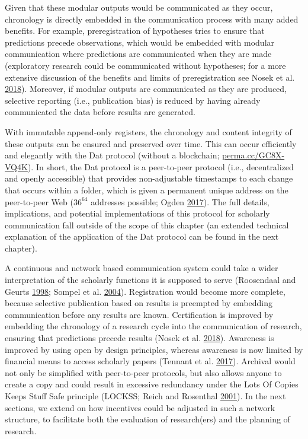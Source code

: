 \documentclass[a5paper]{book}
\begin{document}
Given that these modular outputs would be communicated as they occur,
chronology is directly embedded in the communication process with many
added benefits. For example, preregistration of hypotheses tries to
ensure that predictions precede observations, which would be embedded
with modular communication where predictions are communicated when they
are made (exploratory research could be communicated without hypotheses;
for a more extensive discussion of the benefits and limits of
preregistration see Nosek et al.
\protect\hyperlink{ref-doi:10.1073ux2fpnas.1708274114}{2018}). Moreover,
if modular outputs are communicated as they are produced, selective
reporting (i.e., publication bias) is reduced by having already
communicated the data before results are generated.

With immutable append-only registers, the chronology and content
integrity of these outputs can be ensured and preserved over time. This
can occur efficiently and elegantly with the Dat protocol (without a
blockchain; \href{https://perma.cc/GC8X-VQ4K}{perma.cc/GC8X-VQ4K}). In
short, the Dat protocol is a peer-to-peer protocol (i.e., decentralized
and openly accessible) that provides non-adjustable timestamps to each
change that occurs within a folder, which is given a permanent unique
address on the peer-to-peer Web (\(36^{64}\) addresses possible; Ogden
\protect\hyperlink{ref-doi:10.31219ux2fosf.ioux2fnsv2c}{2017}). The full
details, implications, and potential implementations of this protocol
for scholarly communication fall outside of the scope of this chapter
(an extended technical explanation of the application of the Dat
protocol can be found in the next chapter).

A continuous and network based communication system could take a wider
interpretation of the scholarly functions it is supposed to serve
(Roosendaal and Geurts \protect\hyperlink{ref-roosendaal1998}{1998};
Sompel et al.
\protect\hyperlink{ref-doi:10.1045ux2fseptember2004-vandesompel}{2004}).
Registration would become more complete, because selective publication
based on results is preempted by embedding communication before any
results are known. Certification is improved by embedding the chronology
of a research cycle into the communication of research, ensuring that
predictions precede results (Nosek et al.
\protect\hyperlink{ref-doi:10.1073ux2fpnas.1708274114}{2018}). Awareness
is improved by using open by design principles, whereas awareness is now
limited by financial means to access scholarly papers (Tennant et al.
\protect\hyperlink{ref-doi:10.12688ux2ff1000research.12037.3}{2017}).
Archival would not only be simplified with peer-to-peer protocols, but
also allows anyone to create a copy and could result in excessive
redundancy under the Lots Of Copies Keeps Stuff Safe principle (LOCKSS;
Reich and Rosenthal
\protect\hyperlink{ref-doi:10.1045ux2fjune2001-reich}{2001}). In the
next sections, we extend on how incentives could be adjusted in such a
network structure, to facilitate both the evaluation of research(ers)
and the planning of research.
\end{document}
